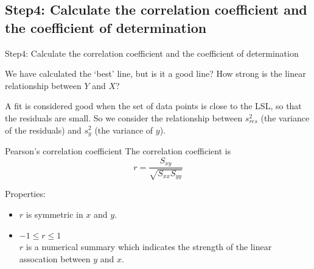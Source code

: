 \documentclass[t,xcolor=pdftex,dvipsnames,table]{beamer}
\makeatletter
\def\maxwidth{ %
  \ifdim\Gin@nat@width>\linewidth
    \linewidth
  \else
    \Gin@nat@width
  \fi
}
\newcommand{\hlnum}[1]{\textcolor[rgb]{0.686,0.059,0.569}{#1}}%
\newcommand{\hlstr}[1]{\textcolor[rgb]{0.192,0.494,0.8}{#1}}%
\newcommand{\hlopt}[1]{\textcolor[rgb]{0,0,0}{#1}}%
\newcommand{\hlstd}[1]{\textcolor[rgb]{0.345,0.345,0.345}{#1}}%
\newcommand{\hlkwb}[1]{\textcolor[rgb]{0.69,0.353,0.396}{#1}}%
\newcommand{\hlkwc}[1]{\textcolor[rgb]{0.333,0.667,0.333}{#1}}%
\newcommand{\hlkwd}[1]{\textcolor[rgb]{0.737,0.353,0.396}{\textbf{#1}}}%
\newenvironment{kframe}{%
 \def\at@end@of@kframe{}%
 \ifinner\ifhmode%
  \def\at@end@of@kframe{\end{minipage}}%
  \begin{minipage}{\columnwidth}%
 \fi\fi%
 \def\FrameCommand##1{\hskip\@totalleftmargin \hskip-\fboxsep
 \colorbox{shadecolor}{##1}\hskip-\fboxsep
     \hskip-\linewidth \hskip-\@totalleftmargin \hskip\columnwidth}%
 \MakeFramed {\advance\hsize-\width
   \@totalleftmargin\z@ \linewidth\hsize
   \@setminipage}}%
 {\par\unskip\endMakeFramed%
 \at@end@of@kframe}
\newenvironment{knitrout}{}{} %
\makeatother
\begin{document}


\subsection[]{Step4: Calculate the correlation coefficient and the coefficient of determination}
\begin{frame}[fragile]{Step4: Calculate the correlation coefficient and the coefficient of determination}

We have calculated the ‘best’ line, but is it a good line? How strong is the linear relationship between $Y$ and $X$?

\vspace{.5cm}
A fit is considered good when the set of data points is close to the LSL, so that the residuals are small. So we consider the relationship between $s_{res}^2$ (the variance of the residuals) and $s_{y}^2$   (the variance of $y$).
\end{frame} 

\begin{frame}[fragile]{Pearson's correlation coefficient}
The correlation coefficient is
\[ \boxed{ r =  \frac{ S_{xy} }{\sqrt{ S_{xx} S_{yy}} } } \]

Properties:
\begin{itemize}
\item
$r$ is symmetric in $x$ and $y$.

\item $-1 \leq r \leq 1$ \\
$r$ is a numerical summary which indicates the strength of the linear assocation between $y$ and $x$.
\end{itemize}
\end{frame} 
\end{document}
